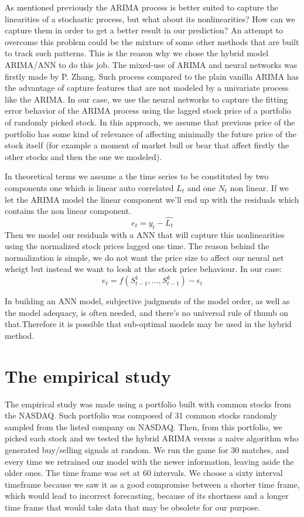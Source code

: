 \documentclass[twocolumn]{article}
\begin{document}
As mentioned previously the ARIMA process is better suited to capture the linearities of a stochastic process, but what about its nonlinearities? How can we capture them in order to get a better result in our prediction?
An attempt to overcome this problem could be the mixture of some other methods that are built to track such patterns. This is the reason why we chose the hybrid model ARIMA/ANN to do this job.
The mixed-use of ARIMA and neural networks was firstly made by P. Zhang.
Such process compared to the plain vanilla ARIMA has the advantage of capture features that are not modeled by a univariate process like the ARIMA. In our case, we use the neural networks to capture the fitting error behavior of the ARIMA process using the lagged stock price of a portfolio of randomly picked stock. In this approach, we assume that previous price of the portfolio has some kind of relevance of affecting minimally the future price of the stock itself (for example a moment of market bull or bear that affect firstly the other stocks and then the one we modeled).

In theoretical terms we assume a the time series to be constituted by two components one which is linear auto correlated $L_t$ and one $N_t$ non linear. If we let the ARIMA model the linear component we'll end up with the residuals which contains the non linear component.
$$
e_t=y_t-\hat{L_t}
$$
Then we model our residuals with a ANN that will capture this nonlinearities using the normalized stock prices lagged one time. The reason behind the normalization is simple, we do not want the price size to affect our neural net wheigt but instead we want to look at the stock price behaviour. In our case:
$$
e_t=f(S^1_{t-1},..., S^k_{t-1})-\epsilon_t
$$

In building an ANN model, subjective judgments of the model order, as well as the model adequacy, is often needed, and there's no universal rule of thumb on that.Therefore it is possible that sub-optimal models may be used in the hybrid method.


\section{The empirical study}
The empirical study was made using a portfolio built with common stocks from the NASDAQ. Such portfolio was composed of 31 common stocks randomly sampled from the listed company on NASDAQ. Then, from this portfolio, we picked each stock and we tested the hybrid ARIMA versus a naive algorithm who generated buy/selling signals at random. We run the game for 30 matches, and every time we retrained our model with the newer information, leaving aside the older ones. The time frame was set at 60 intervals. We choose a sixty interval timeframe because we saw it as a good compromise between  a shorter time frame, which would lead to incorrect forecasting, because of its shortness and a longer time frame that would take data that may be obsolete for our purpose.
\end{document}

